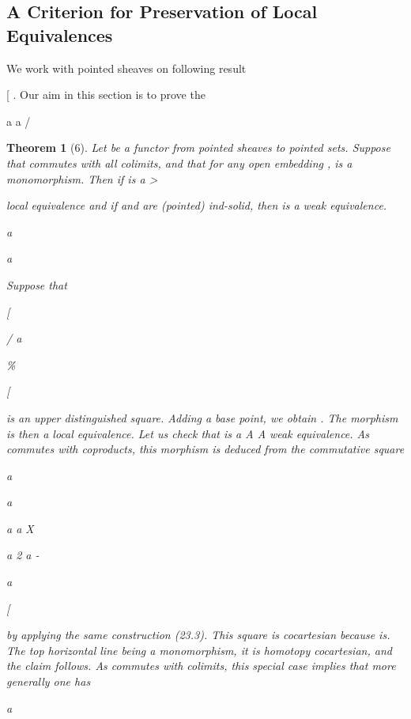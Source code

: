 \documentclass[11pt,a4paper]{article}
\theoremstyle{plain}
\newtheorem{theorem}{Theorem}
\theoremstyle{definition}
\begin{document}
\subsection{A Criterion for Preservation of Local Equivalences}

We work with pointed sheaves on
following result

[ . Our aim in this section is to prove the

a
a  
/

\begin{theorem}[6]
Let
be a functor from pointed sheaves to pointed sets. Suppose
that
commutes with all colimits, and that for any open embedding
,
is a monomorphism. Then if
is
a
>


local equivalence and if  and  are (pointed) ind-solid, then
is a weak
equivalence.

a

a  



Suppose that

[

/
a 





  



\%  

[

is an upper distinguished square. Adding a base point, we obtain
. The morphism
is then a local equivalence. Let us check that
is a
A
A
weak equivalence. As commutes with coproducts, this morphism is deduced from
the commutative square



a

a

a     a X  







a 2   a -  

 a 



[

by applying the same construction (23.3). This square is cocartesian because is.
The top horizontal line being a monomorphism, it is homotopy cocartesian, and the
claim follows. As commutes with colimits, this special case implies that more
generally one has

a

\end{theorem}
\end{document}
